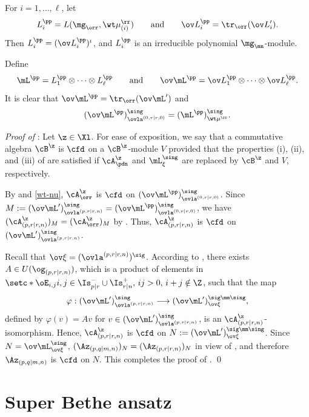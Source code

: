 \documentclass[11pt, reqno]{amsart}
\theoremstyle{definition}
\theoremstyle{remark}
\numberwithin{equation}{section}
\begin{document}
For $i=1,\ldots,\ell$, let
$$
L^\pp_i=L(\mg_\orr, \wt\mu_{(i)}^\rr) \qquad \text{and} \qquad \ov L^\pp_i=\tr_\orr(\ov L^\prime_i).
$$
Then $L^\pp_i=(\ov L^\pp_i)^\iota$, and $L^\pp_i$ is an irreducible polynomial $\mg_\mn$-module.

Define
$$
\mL^\pp= L_1^\pp\otimes\cdots\otimes  L^\pp_\ell  \qquad \text{and} \qquad \ov\mL^\pp=\ov L_1^\pp\otimes\cdots\otimes \ov L^\pp_\ell.
$$
It is clear that $\ov \mL^\pp=\tr_\orr(\ov \mL^\prime)$ and
\begin{equation} \label{wt-nu}
(\ov\mL^\pp)_{\ovla^{(0, r|r, 0)}}^\sing=(\mL^\pp)_{\wt\mu^\rr}^\sing.
\end{equation}


\vspace{3mm}

\noindent\emph{Proof of }:
Let $\z \in \Xl$. For ease of exposition, we say that a commutative algebra $\cB^\z$ is $\cfd$ on a $\cB^\z$-module $V$ provided that the properties (i), (ii), and (iii) of  are satisfied if $\cA_\pdn^\z$ and $\mL_\xi^{\sing}$ are replaced by $\cB^\z$ and $V$, respectively.

By  and \eqref{wt-nu},  $\cA_\orr^\z$ is $\cfd$ on  $(\ov\mL^\pp)_{\ovla^{(0, r|r, 0)}}^\sing$.
Since $M:=( \ov \mL^\prime)_{\ovla^{(p, r|r, n)}}^\sing=(\ov\mL^\pp)_{\ovla^{(0, r|r, 0)}}^\sing$, we have $(\cA_{(p,r|r,n)}^\z)_M=(\cA_\orr^\z)_M$ by .
Thus, $\cA_{(p,r|r,n)}^\z$ is $\cfd$ on $( \ov \mL^\prime)_{\ovla^{(p, r|r, n)}}^\sing$.

Recall that $\ov\xi=(\ovla^{(p, r|r, n)})^\sig$.
According to , there exists $A \in U(\og_{(p, r|r,n)})$, which is a product of elements in $\setc*{ \oE_{i,j} }{i,j \in \Is^-_{p|r}\cup\Is^+_{r|n}, \, ij>0, \, i+j \notin \Z}$, such that the map
\begin{equation} \label{Arr-iso}
\varphi: (\ov\mL^\prime)_{\ovla^{(p, r|r, n)}}^\sing \longrightarrow   (\ov\mL^\prime)_{\ov\xi}^{\sig\mm\sing},
\end{equation}
defined by $\varphi(v)=A v$ for $v \in (\ov\mL^\prime)_{\ovla^{(p, r|r, n)}}^\sing$, is an $\cA^\z_{(p, r|r,n)}$-isomorphism.
Hence, $\cA_{(p,r|r,n)}^\z$ is $\cfd$ on $N:=(\ov\mL^\prime)_{\ov\xi}^{\sig\mm\sing}$.
Since $N=\ov\mL_{\ov\xi}^\sing$, $(\Az_{(p, q|m, n)})_N=(\Az_{(p, r|r, n)})_N$ in view of , and therefore $\Az_{(p, q|m, n)}$ is $\cfd$ on $N$.
This completes the proof of .
\qed



\section{Super Bethe ansatz} \label{Bethe-ans}
\end{document}
